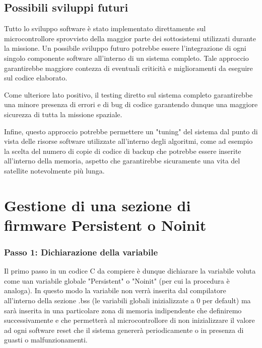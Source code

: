 \documentclass[LaM,binding=0.6cm,oneside]{../sapthesis}
\begin{document}
\section{Possibili sviluppi futuri}
Tutto lo sviluppo software è stato implementato direttamente sul microcontrollore sprovvisto della maggior parte dei sottosistemi utilizzati durante la missione. Un possibile
sviluppo futuro potrebbe essere l'integrazione di ogni singolo componente software all'interno di un sistema completo. Tale approccio garantirebbe maggiore contezza
di eventuali criticità e miglioramenti da eseguire sul codice elaborato. 

Come ulteriore lato positivo, il testing diretto sul sistema completo garantirebbe una  minore presenza di errori e di bug di codice garantendo dunque una maggiore 
sicurezza di tutta la missione spaziale. 

Infine, questo approccio potrebbe permettere un "tuning" del sistema dal punto di vista delle  risorse software utilizzate all'interno degli algoritmi, come ad esempio la scelta del numero di copie di codice di backup che potrebbe essere inserite all'interno della memoria,
aspetto che garantirebbe sicuramente una vita del satellite notevolmente più lunga.
\appendix
\chapter{Gestione di una sezione di firmware Persistent o Noinit}

\subsection{Passo 1: Dichiarazione della variabile}
Il primo passo in un codice C da compiere è dunque dichiarare la variabile voluta come uan variabile globale "Persistent" o "Noinit" (per cui la procedura è analoga). In questo modo la variabile non verrà inserita dal compilatore all'interno della sezione .bss (le variabili globali inizializzate a 0 per default) ma sarà inserita in una particolare zona di memoria indipendente che definiremo successivamente e che permetterà al microcontrollore di non inizializzare il valore ad ogni software reset che il sistema genererà periodicamente o in presenza di guasti o malfunzionamenti.
\end{document}
